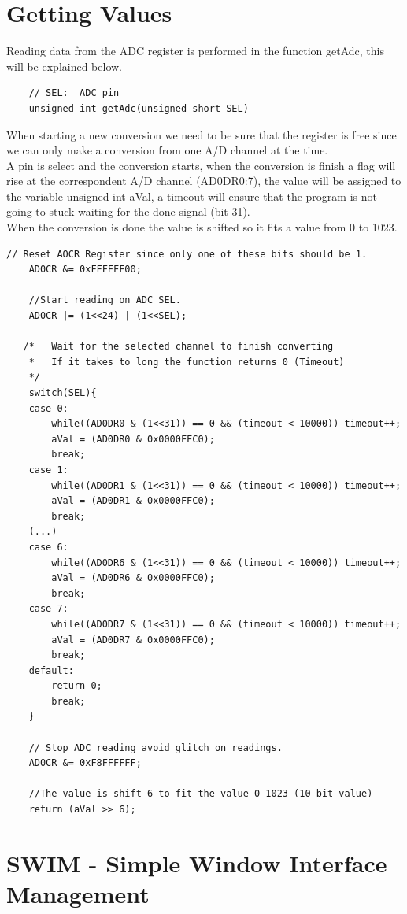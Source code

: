 \newpage

\section{Getting Values}
Reading data from the ADC register is performed in the function getAdc, this will be explained below.

\begin{lstlisting}
	// SEL:  ADC pin 
	unsigned int getAdc(unsigned short SEL)
\end{lstlisting}

When starting a new conversion we need to be sure that the register is free since we can only make a conversion from one A/D channel at the time. \\ A pin is select and the conversion starts, when the conversion is finish a flag will rise at the correspondent A/D channel (AD0DR0:7), the value will be assigned to the variable unsigned int aVal, a timeout will ensure that the program is not going to stuck waiting for the done signal (bit 31).\\ When the conversion is done the value is shifted so it fits a value from 0 to 1023.

\begin{lstlisting}
// Reset AOCR Register since only one of these bits should be 1.
	AD0CR &= 0xFFFFFF00;

	//Start reading on ADC SEL.
	AD0CR |= (1<<24) | (1<<SEL);

   /*	Wait for the selected channel to finish converting
	*	If it takes to long the function returns 0 (Timeout)
	*/
	switch(SEL){
	case 0:
		while((AD0DR0 & (1<<31)) == 0 && (timeout < 10000)) timeout++;
		aVal = (AD0DR0 & 0x0000FFC0);
		break;
	case 1:
		while((AD0DR1 & (1<<31)) == 0 && (timeout < 10000)) timeout++;
		aVal = (AD0DR1 & 0x0000FFC0);
		break;
	(...)
	case 6:
		while((AD0DR6 & (1<<31)) == 0 && (timeout < 10000)) timeout++;
		aVal = (AD0DR6 & 0x0000FFC0);
		break;
	case 7:
		while((AD0DR7 & (1<<31)) == 0 && (timeout < 10000)) timeout++;
		aVal = (AD0DR7 & 0x0000FFC0);
		break;
	default:
		return 0;
		break;
	}

	// Stop ADC reading avoid glitch on readings.
	AD0CR &= 0xF8FFFFFF;

	//The value is shift 6 to fit the value 0-1023 (10 bit value)
	return (aVal >> 6);
\end{lstlisting}

\newpage

\section{SWIM - Simple Window Interface Management}


